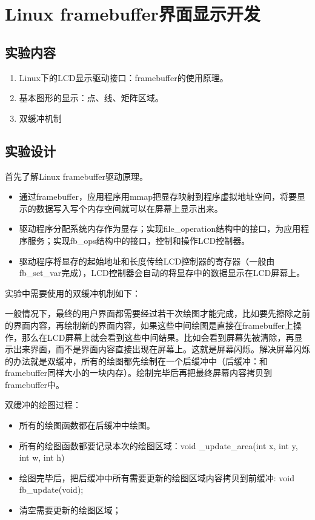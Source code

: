 \documentclass{report}
\begin{document}
\chapter{Linux framebuffer界面显示开发}
\section{实验内容}
\begin{enumerate}
    \item Linux下的LCD显示驱动接口：framebuffer的使用原理。
    \item 基本图形的显示：点、线、矩阵区域。
    \item 双缓冲机制
\end{enumerate}

\section{实验设计}
\par 首先了解Linux framebuffer驱动原理。
\begin{itemize}
    \item 通过framebuffer，应用程序用mmap把显存映射到程序虚拟地址空间，将要显示的数据写入写个内存空间就可以在屏幕上显示出来。
    \item 驱动程序分配系统内存作为显存；实现file\_operation结构中的接口，为应用程序服务；实现fb\_ops结构中的接口，控制和操作LCD控制器。
    \item 驱动程序将显存的起始地址和长度传给LCD控制器的寄存器（一般由fb\_set\_var完成），LCD控制器会自动的将显存中的数据显示在LCD屏幕上。
\end{itemize}

\par 实验中需要使用的双缓冲机制如下：
\par 一般情况下，最终的用户界面都需要经过若干次绘图才能完成，比如要先擦除之前的界面内容，再绘制新的界面内容，如果这些中间绘图是直接在framebuffer上操作，那么在LCD屏幕上就会看到这些中间结果。比如会看到屏幕先被清除，再显示出来界面，而不是界面内容直接出现在屏幕上。这就是屏幕闪烁。解决屏幕闪烁的办法就是双缓冲，所有的绘图都先绘制在一个后缓冲中（后缓冲：和framebuffer同样大小的一块内存）。绘制完毕后再把最终屏幕内容拷贝到framebuffer中。

\par 双缓冲的绘图过程：

\begin{itemize}
    \item 所有的绘图函数都在后缓冲中绘图。
    \item 所有的绘图函数都要记录本次的绘图区域：void \_update\_area(int x, int y, int w, int h)
    \item 绘图完毕后，把后缓冲中所有需要更新的绘图区域内容拷贝到前缓冲: void fb\_update(void);
    \item 清空需要更新的绘图区域；
\end{itemize}
\end{document}

